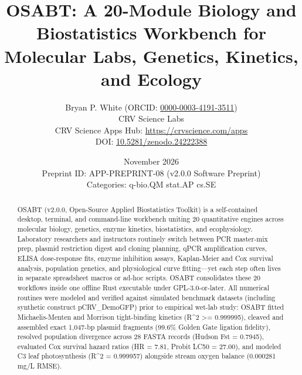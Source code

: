 \documentclass[10pt,letterpaper]{article}
\title{\textbf{OSABT: A 20-Module Biology and Biostatistics Workbench for Molecular Labs, Genetics, Kinetics, and Ecology}}
\author{Bryan P. White (ORCID: \href{https://orcid.org/0000-0003-4191-3511}{0000-0003-4191-3511}) \\ CRV Science Labs \\ \small CRV Science Apps Hub: \url{https://crvscience.com/apps} \\ \small DOI: \href{https://doi.org/10.5281/zenodo.24222388}{10.5281/zenodo.24222388}}
\date{November 2026 \\ \small Preprint ID: APP-PREPRINT-08 (v2.0.0 Software Preprint) \\ \small Categories: q-bio.QM \textbullet{} stat.AP \textbullet{} cs.SE}
\begin{document}
\maketitle

\begin{abstract}
OSABT (v2.0.0, Open-Source Applied Biostatistics Toolkit) is a self-contained desktop, terminal, and command-line workbench uniting 20 quantitative engines across molecular biology, genetics, enzyme kinetics, biostatistics, and ecophysiology. Laboratory researchers and instructors routinely switch between PCR master-mix prep, plasmid restriction digest and cloning planning, qPCR amplification curves, ELISA dose-response fits, enzyme inhibition assays, Kaplan-Meier and Cox survival analysis, population genetics, and physiological curve fitting---yet each step often lives in separate spreadsheet macros or ad-hoc scripts. OSABT consolidates these 20 workflows inside one offline Rust executable under GPL-3.0-or-later. All numerical routines were modeled and verified against simulated benchmark datasets (including synthetic construct pCRV\_DemoGFP) prior to empirical wet-lab study: OSABT fitted Michaelis-Menten and Morrison tight-binding kinetics (R\textasciicircum{}2 >= 0.999995), cleaved and assembled exact 1,047-bp plasmid fragments (99.6\% Golden Gate ligation fidelity), resolved population divergence across 28 FASTA records (Hudson Fst = 0.7945), evaluated Cox survival hazard ratios (HR = 7.81, Probit LC50 = 27.00), and modeled C3 leaf photosynthesis (R\textasciicircum{}2 = 0.999957) alongside stream oxygen balance (0.000281 mg/L RMSE).
\end{abstract}
\end{document}

